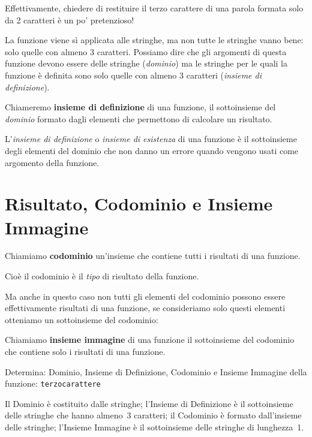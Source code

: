 Effettivamente, chiedere di restituire il terzo carattere di una parola 
formata solo da 2 caratteri è un po' pretenzioso!

La funzione viene sì applicata alle stringhe, ma non 
tutte le stringhe vanno bene: solo quelle con almeno 3 caratteri. 
Possiamo dire che gli argomenti di questa funzione devono essere delle 
stringhe (\emph{dominio}) ma le stringhe per le quali la funzione è 
definita sono solo quelle con almeno 3 caratteri 
(\emph{insieme di definizione}).

\begin{definizione}
Chiameremo \textbf{insieme di definizione}  di una funzione, il 
sottoinsieme del \emph{dominio} formato dagli elementi che permettono di 
calcolare un risultato.
\end{definizione}

L'\emph{insieme di definizione} o \emph{insieme di esistenza} di una 
funzione è il sottoinsieme degli elementi del dominio che non danno un 
errore quando vengono usati come argomento della funzione.

\section{Risultato, Codominio e Insieme Immagine}
\label{sec:funzioni2_codominio}

\begin{definizione}
Chiamiamo \textbf{codominio} un'insieme che contiene tutti i risultati di 
una funzione.
\end{definizione}

Cioè il codominio è il \emph{tipo} di risultato della funzione.

Ma anche in questo caso non tutti gli elementi del codominio possono essere 
effettivamente risultati di una funzione, se consideriamo solo questi 
elementi otteniamo un sottoinsieme del codominio:

\begin{definizione}
Chiamiamo \textbf{insieme immagine} di una funzione il sottoinsieme del 
codominio che contiene solo i risultati di una funzione.
\end{definizione}

\begin{esempio}
Determina: Dominio, Insieme di Definizione, Codominio e Insieme Immagine 
della funzione: \texttt{terzocarattere} 

Il Dominio è costituito dalle stringhe; l'Insieme di Definizione è il 
sottoinsieme delle stringhe che hanno almeno~3 caratteri; il Codominio è 
formato dall'insieme delle stringhe; l'Insieme Immagine è il sottoinsieme 
delle stringhe di lunghezza~1.
\end{esempio}

